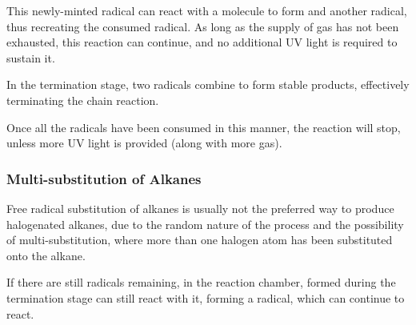				This newly-minted  radical can react with a  molecule to form  and another
				\ch{\chlorine} radical, thus recreating the consumed radical. As long as the supply of  gas has
				not been exhausted, this reaction can continue, and no additional UV light is required to sustain it.


			\pagebreak

				In the termination stage, two radicals combine to form stable products, effectively terminating the chain reaction.


				Once all the radicals have been consumed in this manner, the reaction will stop, unless more UV light is provided (along
				with more  gas).




		\subsubsection{Multi-substitution of Alkanes}

			Free radical substitution of alkanes is usually not the preferred way to produce
			halogenated alkanes, due to the random nature of the process and the possibility of multi-substitution,
			where more than one halogen atom has been substituted onto the alkane.

			If there are still \ch{\chlorine} radicals remaining, in the reaction chamber,  formed during the
			termination stage can still react with it, forming a  radical, which can continue to react.

